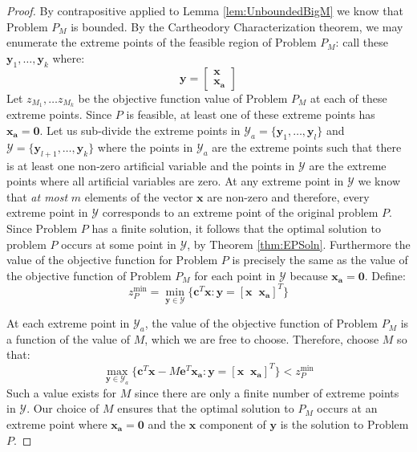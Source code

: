 \begin{proof} By contrapositive applied to Lemma \ref{lem:UnboundedBigM} we know that Problem $P_M$ is bounded. By the Cartheodory Characterization theorem, we may enumerate the extreme points of the feasible region of Problem $P_M$: call these $\mathbf{y}_1,\dots,\mathbf{y}_k$ where:
\begin{displaymath}
\mathbf{y} = \begin{bmatrix}
\mathbf{x}\\\mathbf{x_a}
\end{bmatrix}
\end{displaymath}
Let $z_{M_1},\dots z_{M_k}$ be the objective function value of Problem $P_M$ at each of these extreme points. Since $P$ is feasible, at least one of these extreme points has $\mathbf{x_a} = \mathbf{0}$. Let us sub-divide the extreme points in $\mathcal{Y}_a = \{\mathbf{y}_1,\dots,\mathbf{y}_l\}$ and $\mathcal{Y}=\{\mathbf{y}_{l+1}, \dots, \mathbf{y}_k\}$ where the points in $\mathcal{Y}_a$ are the extreme points such that there is at least one non-zero artificial variable and the points in $\mathcal{Y}$ are the extreme points where all artificial variables are zero. At any extreme point in $\mathcal{Y}$ we know that \textit{at most} $m$ elements of the vector $\mathbf{x}$ are non-zero and therefore, every extreme point in $\mathcal{Y}$ corresponds to an extreme point of the original problem $P$. Since Problem $P$ has a finite solution, it follows that the optimal solution to problem $P$ occurs at some point in $\mathcal{Y}$, by Theorem \ref{thm:EPSoln}. Furthermore the value of the objective function for Problem $P$ is precisely the same as the value of the objective function of Problem $P_M$ for each point in $\mathcal{Y}$ because $\mathbf{x_a} = \mathbf{0}$. Define:
\begin{equation}
z^\text{min}_P = \min_{\mathbf{y} \in \mathcal{Y}} \{\mathbf{c}^T\mathbf{x} : \mathbf{y} = [\mathbf{x} \;\; \mathbf{x_a}]^T\}
\end{equation}

At each extreme point in $\mathcal{Y}_a$, the value of the objective function of Problem $P_M$ is a function of the value of $M$, which we are free to choose. Therefore, choose $M$ so that:
\begin{equation}
\max_{\mathbf{y} \in \mathcal{Y}_a} \{\mathbf{c}^T\mathbf{x} - M\mathbf{e}^T\mathbf{x_a}: \mathbf{y} = [\mathbf{x} \;\; \mathbf{x_a}]^T\} < z^\text{min}_P
\end{equation}
Such a value exists for $M$ since there are only a finite number of extreme points in $\mathcal{Y}$. Our choice of $M$ ensures that the optimal solution to $P_M$ occurs at an extreme point where $\mathbf{x_a} = \mathbf{0}$ and the $\mathbf{x}$ component of $\mathbf{y}$ is the solution to Problem $P$. 
\end{proof}

